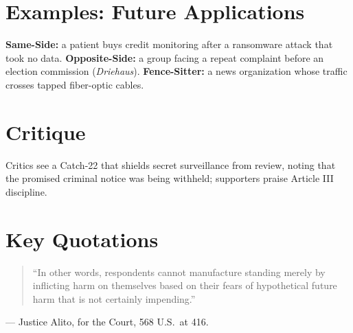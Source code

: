 \documentclass[12pt]{article}
\begin{document}
\section{Examples: Future Applications}
\textbf{Same-Side:} a patient buys credit monitoring after a ransomware attack that took no data. \textbf{Opposite-Side:} a group facing a repeat complaint before an election commission (\textit{Driehaus}). \textbf{Fence-Sitter:} a news organization whose traffic crosses tapped fiber-optic cables.

\section{Critique}
Critics see a Catch-22 that shields secret surveillance from review, noting that the promised criminal notice was being withheld; supporters praise Article III discipline.

\section{Key Quotations}
\begin{quote}
``In other words, respondents cannot manufacture standing merely by inflicting harm on themselves based on their fears of hypothetical future harm that is not certainly impending.''
\end{quote}
\noindent --- Justice Alito, for the Court, 568 U.S.\ at 416.
\end{document}

